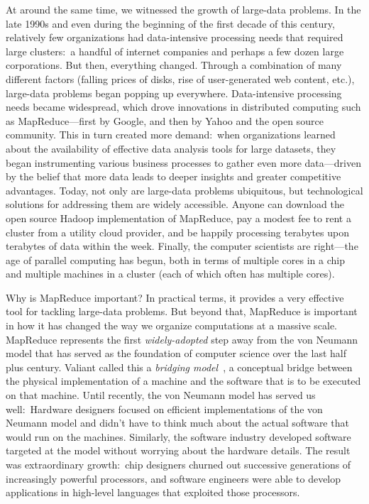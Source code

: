 At around the same time, we witnessed the growth of large-data
problems.  In the late 1990s and even during the beginning of the
first decade of this century, relatively few organizations had
data-intensive processing needs that required large clusters:\ a
handful of internet companies and perhaps a few dozen large
corporations.  But then, everything changed.  Through a combination of
many different factors (falling prices of disks, rise of
user-generated web content, etc.), large-data problems began popping
up everywhere.  Data-intensive processing needs became widespread,
which drove innovations in distributed computing such as
MapReduce---first by Google, and then by Yahoo and the open source
community.  This in turn created more demand:\ when organizations
learned about the availability of effective data analysis tools for
large datasets, they began instrumenting various business processes to
gather even more data---driven by the belief that more data leads to
deeper insights and greater competitive advantages.  Today, not only
are large-data problems ubiquitous, but technological solutions for
addressing them are widely accessible.  Anyone can download the open
source Hadoop implementation of MapReduce, pay a modest fee to rent a
cluster from a utility cloud provider, and be happily processing
terabytes upon terabytes of data within the week.  Finally, the
computer scientists are right---the age of parallel computing has
begun, both in terms of multiple cores in a chip and multiple machines
in a cluster (each of which often has multiple cores).

Why is MapReduce important?  In practical terms, it provides a very
effective tool for tackling large-data problems.  But beyond that,
MapReduce is important in how it has changed the way we organize
computations at a massive scale.  MapReduce represents the first \emph{
  widely-adopted} step away from the von Neumann model that has served
as the foundation of computer science over the last half plus century.
Valiant called this a \emph{bridging model}~\cite{Valiant_CACM1990}, a
conceptual bridge between the physical implementation of a machine and
the software that is to be executed on that machine.  Until recently,
the von Neumann model has served us well:\ Hardware designers focused
on efficient implementations of the von Neumann model and didn't have
to think much about the actual software that would run on the
machines.  Similarly, the software industry developed software
targeted at the model without worrying about the hardware details.
The result was extraordinary growth:\ chip designers churned out
successive generations of increasingly powerful processors, and
software engineers were able to develop applications in high-level
languages that exploited those processors.


